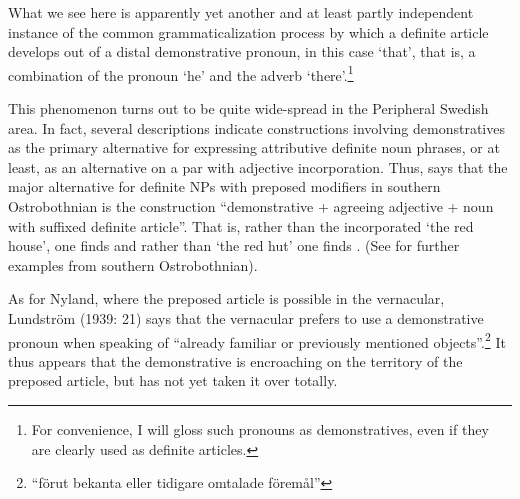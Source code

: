 
\ea\label{}

\z 
\z 

What we see here is apparently yet another and at least partly independent instance of the common grammaticalization process by which a definite article develops out of a distal demonstrative pronoun, in this case  ‘that’, that is, a combination of the pronoun  ‘he’ and the adverb  ‘there’.\footnote{ For convenience, I will gloss such pronouns as demonstratives, even if they are clearly used as definite articles.} 


This phenomenon turns out to be quite wide-spread in the Peripheral Swedish area. In fact, several descriptions indicate constructions involving demonstratives as the primary alternative for expressing attributive definite noun phrases, or at least, as an alternative on a par with adjective incorporation. Thus, \citet{Ivars2005} says that the major alternative for definite NPs with preposed modifiers in southern Ostrobothnian is the construction “demonstrative  + agreeing adjective + noun with suffixed definite article”. That is, rather than the incorporated  ‘the red house’, one finds  and rather than  ‘the red hut’ one finds . (See \citet[158]{Vangsnes2003} for further examples from southern Ostrobothnian). 


As for Nyland, where the preposed article is possible in the vernacular, Lundström (1939: 21) says that the vernacular prefers to use a demonstrative pronoun when speaking of “already familiar or previously mentioned objects”.\footnote{ “förut bekanta eller tidigare omtalade föremål”} It thus appears that the demonstrative is encroaching on the territory of the preposed article, but has not yet taken it over totally. 

